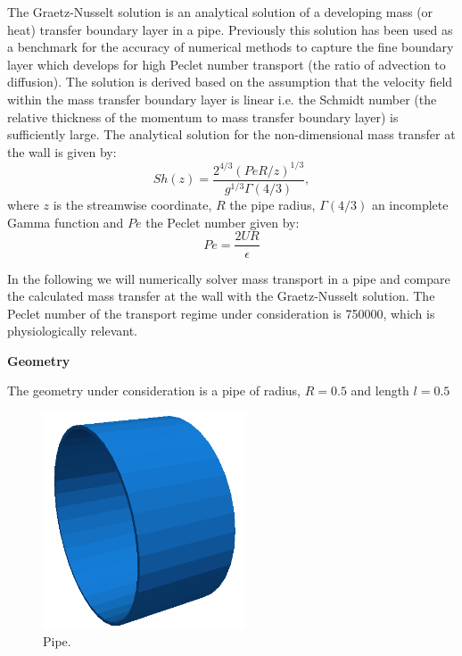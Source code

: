 The Graetz-Nusselt solution is an analytical solution of a developing mass (or heat) transfer boundary layer in a pipe. 
Previously this solution has been used as a benchmark for the accuracy of numerical methods to capture the fine 
boundary layer which develops for high Peclet number transport (the ratio of advection to diffusion). 
The solution is derived based on the assumption that the velocity field within the mass transfer boundary layer 
is linear i.e. the Schmidt number (the relative thickness of the momentum to mass transfer boundary layer) is sufficiently large. 
The analytical solution for the non-dimensional mass transfer at the wall is given by:
\begin{equation}
S h(z) = \dfrac{2^{4/3}(Pe R/z)^{1/3}}{g^{1/3}\Gamma(4/3)} , 
\end{equation}
where $z$ is the streamwise coordinate, $R$ the pipe radius, $\Gamma(4/3)$ an incomplete 
Gamma function and $Pe$ the Peclet number given by:
\begin{equation}
Pe = \dfrac{2 U R}{\epsilon}
\end{equation}

In the following we will numerically solver mass transport in a pipe and compare the calculated mass transfer 
at the wall with the Graetz-Nusselt solution. The Peclet number of the transport regime under consideration is 
750000, which is physiologically relevant.

\textbf{Geometry}

The geometry under consideration is a pipe of radius, $R = 0.5$ and length $l = 0.5$

\begin{figure}[h!]
\begin{center}
\includegraphics[width=6cm]{Figures/pipe}
\caption{Pipe.}
\end{center}
\end{figure}

